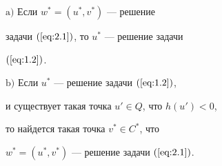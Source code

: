 \begin{prop} \label{pro:2.1}


$\mathrm{a)}$ Если $w^*=(u^*, v^*)$ --- решение 


задачи $(\ref{eq:2.1})$, то $u^*$ --- решение задачи 


$(\ref{eq:1.2})$.





$\mathrm{b)}$ Если $u^*$ --- решение задачи $(\ref{eq:1.2})$,


и существует такая точка $u' \in Q$, что $h(u') < 0$,


то найдется такая точка $v^* \in C^*$, что


$w^*=(u^*, v^*)$ --- решение задачи $(\ref{eq:2.1})$.


\end{prop}





